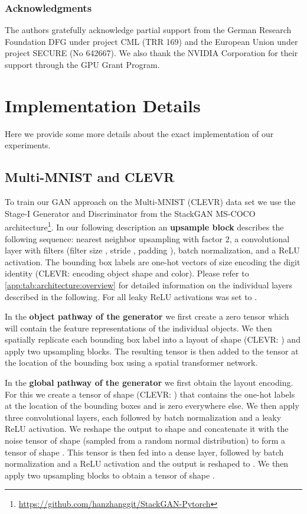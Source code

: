 \documentclass{article} \usepackage{iclr2019_conference,times}
\begin{document}
	
	\subsubsection*{Acknowledgments}
	The authors gratefully acknowledge partial support from the German Research Foundation DFG under project CML (TRR 169) and the European Union under project SECURE (No 642667). We also thank the NVIDIA Corporation for their support through the GPU Grant Program.
	
	\clearpage
	
	
	
	\clearpage
	\appendix
	\section{Implementation Details}
	\label{app:implementation:details}
	Here we provide some more details about the exact implementation of our experiments.
	
	\subsection{Multi-MNIST and CLEVR}
	To train our GAN approach on the Multi-MNIST (CLEVR) data set we use the Stage-I Generator and Discriminator from the StackGAN MS-COCO architecture\footnote{\label{note1} \url{https://github.com/hanzhanggit/StackGAN-Pytorch}}.
	In our following description an \textbf{upsample block} describes the following sequence: nearest neighbor upsampling with factor 2, a convolutional layer with  filters (filter size , stride , padding ), batch normalization, and a ReLU activation.
	The bounding box labels are one-hot vectors of size  encoding the digit identity (CLEVR:  encoding object shape and color).
	Please refer to \autoref{app:tab:architecture:overview} for detailed information on the individual layers described in the following. For all leaky ReLU activations  was set to .
	
	In the \textbf{object pathway of the generator} we first create a zero tensor  which will contain the feature representations of the individual objects.
	We then spatially replicate each bounding box label into a  layout of shape  (CLEVR: ) and apply two upsampling blocks.
	The resulting tensor is then added to the tensor  at the location of the bounding box using a spatial transformer network.
	
	In the \textbf{global pathway of the generator} we first obtain the layout encoding.
	For this we create a tensor of shape  (CLEVR: ) that contains the one-hot labels at the location of the bounding boxes and is zero everywhere else.
	We then apply three convolutional layers, each followed by batch normalization and a leaky ReLU activation.
	We reshape the output to shape  and concatenate it with the noise tensor of shape  (sampled from a random normal distribution) to form a tensor of shape .
	This tensor is then fed into a dense layer, followed by batch normalization and a ReLU activation and the output is reshaped to .
	We then apply two upsampling blocks to obtain a tensor of shape .
	
\end{document}
